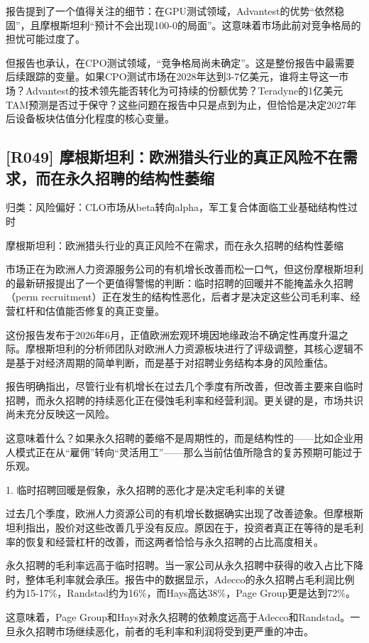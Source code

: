 \documentclass[11pt]{ctexart}
\begin{document}
报告提到了一个值得关注的细节：在GPU测试领域，Advantest的优势“依然稳固”，且摩根斯坦利“预计不会出现100-0的局面”。这意味着市场此前对竞争格局的担忧可能过度了。

但报告也承认，在CPO测试领域，“竞争格局尚未确定”。这是整份报告中最需要后续跟踪的变量。如果CPO测试市场在2028年达到3-7亿美元，谁将主导这一市场？Advantest的技术领先能否转化为可持续的份额优势？Teradyne的1亿美元TAM预测是否过于保守？这些问题在报告中只是点到为止，但恰恰是决定2027年后设备板块估值分化程度的核心变量。

\subsection{[R049] 摩根斯坦利：欧洲猎头行业的真正风险不在需求，而在永久招聘的结构性萎缩}
{\small\color{refgray}归类：风险偏好：CLO市场从beta转向alpha，军工复合体面临工业基础结构性过时}

摩根斯坦利：欧洲猎头行业的真正风险不在需求，而在永久招聘的结构性萎缩

市场正在为欧洲人力资源服务公司的有机增长改善而松一口气，但这份摩根斯坦利的最新研报提出了一个更值得警惕的判断：临时招聘的回暖并不能掩盖永久招聘（perm recruitment）正在发生的结构性恶化，后者才是决定这些公司毛利率、经营杠杆和估值能否修复的真正变量。

这份报告发布于2026年6月，正值欧洲宏观环境因地缘政治不确定性再度升温之际。摩根斯坦利的分析师团队对欧洲人力资源板块进行了评级调整，其核心逻辑不是基于对经济周期的简单判断，而是基于对招聘业务结构本身的风险重估。

报告明确指出，尽管行业有机增长在过去几个季度有所改善，但改善主要来自临时招聘，而永久招聘的持续恶化正在侵蚀毛利率和经营利润。更关键的是，市场共识尚未充分反映这一风险。

这意味着什么？如果永久招聘的萎缩不是周期性的，而是结构性的——比如企业用人模式正在从“雇佣”转向“灵活用工”——那么当前估值所隐含的复苏预期可能过于乐观。

1. 临时招聘回暖是假象，永久招聘的恶化才是决定毛利率的关键

过去几个季度，欧洲人力资源公司的有机增长数据确实出现了改善迹象。但摩根斯坦利指出，股价对这些改善几乎没有反应。原因在于，投资者真正在等待的是毛利率的恢复和经营杠杆的改善，而这两者恰恰与永久招聘的占比高度相关。

永久招聘的毛利率远高于临时招聘。当一家公司从永久招聘中获得的收入占比下降时，整体毛利率就会承压。报告中的数据显示，Adecco的永久招聘占毛利润比例约为15-17\%，Randstad约为16\%，而Hays高达38\%，Page Group更是达到72\%。

这意味着，Page Group和Hays对永久招聘的依赖度远高于Adecco和Randstad。一旦永久招聘市场继续恶化，前者的毛利率和利润将受到更严重的冲击。
\end{document}
